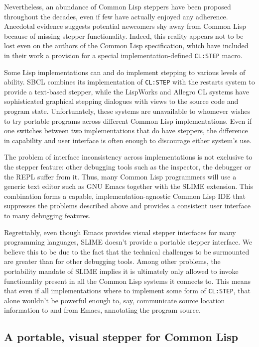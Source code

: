 \documentclass[sigconf]{acmart}
\begin{document}
Nevertheless, an abundance of Common Lisp steppers have been proposed
throughout the decades, even if few have actually enjoyed any
adherence.  Anecdotal evidence suggests potential newcomers shy away
from Common Lisp because of missing stepper functionality.  Indeed,
this reality appears not to be lost even on the authors of the Common
Lisp specification, which have included in their work a provision for
a special implementation-defined \texttt{CL:STEP} macro.

Some Lisp implementations can and do implement stepping to various
levels of ability.  SBCL combines its implementation of
\texttt{CL:STEP} with the restarts system to provide a text-based
stepper, while the LispWorks\cite{lispworks-stepper} and Allegro CL
systems have sophisticated graphical stepping dialogues with views to
the source code and program state.  Unfortunately, these systems are
unavailable to whomever wishes to try portable programs across
different Common Lisp implementations.  Even if one switches between
two implementations that do have steppers, the difference in
capability and user interface is often enough to discourage either
system's use.

The problem of interface inconsistency across implementations is not
exclusive to the stepper feature: other debugging tools such as the
inspector, the debugger or the REPL suffer from it.  Thus, many Common
Lisp programmers will use a generic text editor such as GNU
Emacs\cite{emacs} together with the SLIME\cite{slime} extension.  This
combination forms a capable, implementation-agnostic Common Lisp IDE
that suppresses the problems described above and provides a consistent
user interface to many debugging features.

Regrettably, even though Emacs provides visual stepper interfaces for
many programming languages, SLIME doesn't provide a portable stepper
interface.  We believe this to be due to the fact that the technical
challenges to be surmounted are greater than for other debugging
tools.  Among other problems, the portability mandate of SLIME implies
it is ultimately only allowed to invoke functionality present in all
the Common Lisp systems it connects to.  This means that even if all
implementations where to implement some form of \texttt{CL:STEP}, that
alone wouldn't be powerful enough to, say, communicate source location
information to and from Emacs, annotating the program source.

\subsection{A portable, visual stepper for Common
  Lisp}
\end{document}
